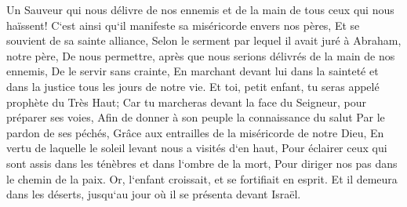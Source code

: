 \verse Un Sauveur qui nous délivre de nos ennemis et de la main de tous ceux qui nous haïssent! 
\verse C`est ainsi qu`il manifeste sa miséricorde envers nos pères, Et se souvient de sa sainte alliance, 
\verse Selon le serment par lequel il avait juré à Abraham, notre père, 
\verse De nous permettre, après que nous serions délivrés de la main de nos ennemis, De le servir sans crainte, 
\verse En marchant devant lui dans la sainteté et dans la justice tous les jours de notre vie. 
\verse Et toi, petit enfant, tu seras appelé prophète du Très Haut; Car tu marcheras devant la face du Seigneur, pour préparer ses voies, 
\verse Afin de donner à son peuple la connaissance du salut Par le pardon de ses péchés, 
\verse Grâce aux entrailles de la miséricorde de notre Dieu, En vertu de laquelle le soleil levant nous a visités d`en haut, 
\verse Pour éclairer ceux qui sont assis dans les ténèbres et dans l`ombre de la mort, Pour diriger nos pas dans le chemin de la paix. 
\verse Or, l`enfant croissait, et se fortifiait en esprit. Et il demeura dans les déserts, jusqu`au jour où il se présenta devant Israël. 

